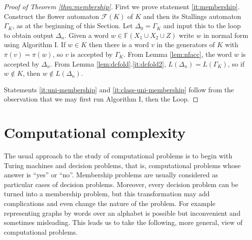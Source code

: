 \documentclass[a4paper,12pt]{article}
\newcommand{\G}{\Gamma }
\newcommand{\D}{\Delta }
\renewcommand{\L}{\Lambda }
\renewcommand{\S}{\Sigma }
\newcommand{\cA}{{\cal{A}}}
\newcommand{\cF}{{\cal{F}}}
\newtheorem{theorem}{Theorem}[section]
\numberwithin{equation}{section}
\numberwithin{figure}{section}
\newcommand{\FF}{\ensuremath{\mathbb{F}}}
\renewcommand{\cF}{\mathcal{F}}
\begin{document}

\begin{proof}[Proof of Theorem \ref{thm:membership}]
First we prove statement \ref{it:membership}. 
Construct the flower automaton $\cF(K)$ of $K$ and then
its Stallings automaton $\G_K$,  as at the beginning of this Section. %
Let $\D_0=\G_K$ and input this to the loop to obtain output $\D_n$.
Given a word $w\in \FF(X_1\cup X_2\cup Z)$ write $w$ in normal form
using Algorithm I. If $w\in K$ then there is a word $v$ in the generators
 of $K$ with $\pi(v)=\pi(w)$, so $v$ is accepted by $\G_K$. From
Lemma \ref{lem:nfacc}, the word $w$ is accepted by $\D_n$. From
Lemma \ref{lem:dcfold}.\ref{it:dcfold2}, $L(\D_n)=L(\G_K)$,
so if $w\notin K$, then
$w\notin L(\D_n)$.

Statements \ref{it:uni-membership} and \ref{it:class-uni-membership} follow
from the observation that we may 
first run Algorithm I, then the Loop.
\end{proof}

\section{Computational complexity}\label{sec:TC}
The usual approach to the study of computational problems is to
begin with Turing machines and decision
problems, that is, computational problems whose answer is ``yes'' or
``no''. Membership problems are usually considered as particular 
cases of decision problems.
Moreover, every decision problem can be turned into a membership
problem, but this transformation may add complications and even
change the nature of the problem. For example representing graphs by
words over an alphabet is possible but inconvenient and sometimes
misleading. This leads us to take the following, more general, view of computational
problems.
\end{document}
